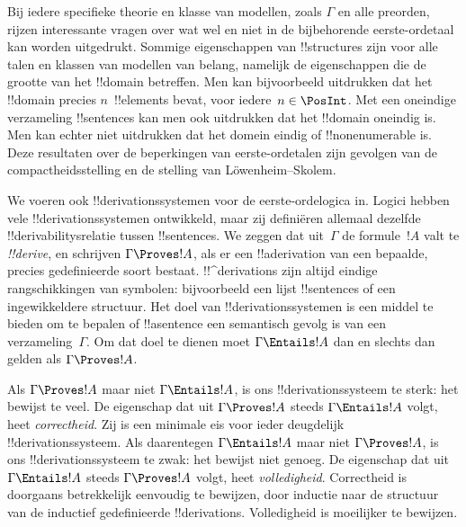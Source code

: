 \documentclass[openany]{memoir}
\begin{document}
Bij iedere specifieke theorie en klasse van modellen, zoals $\Gamma$
en alle preorden, rijzen interessante vragen over wat wel en niet in de
bijbehorende eerste-ordetaal kan worden uitgedrukt. Sommige
eigenschappen van !!{structure}s zijn voor alle talen en klassen van
modellen van belang, namelijk de eigenschappen die de grootte van het
!!{domain} betreffen. Men kan bijvoorbeeld uitdrukken dat het
!!{domain} precies $n$~!!{element}s bevat, voor iedere~$n \in \PosInt$.
Met een
oneindige verzameling !!{sentence}s kan men ook uitdrukken dat het
!!{domain} oneindig is. Men kan echter niet uitdrukken dat het domein
eindig of !!{nonenumerable} is. Deze resultaten over de beperkingen van
eerste-ordetalen zijn gevolgen van de compactheidsstelling en de
stelling van L\"owenheim--Skolem.
\endgroup

\begingroup
\def\olfilename{OLP-0148}
\def\olfilepath{content/first-order-logic/introduction/}
\hypertarget{unit-OLP-0148}{}





We voeren ook !!{derivation}ssystemen voor de eerste-ordelogica in.
Logici hebben vele !!{derivation}ssystemen ontwikkeld, maar zij
definiëren allemaal dezelfde !!{derivability}srelatie tussen
!!{sentence}s. We zeggen dat uit~$\Gamma$ de formule~$!A$ valt te
\emph{!!{derive}}, en schrijven $\Gamma \Proves !A$, als er een
!!a{derivation} van een bepaalde, precies gedefinieerde soort bestaat.
!!^{derivation}s zijn altijd eindige rangschikkingen van symbolen:
bijvoorbeeld een lijst !!{sentence}s of een ingewikkeldere structuur.
Het doel van !!{derivation}ssystemen is een middel te bieden om te
bepalen of !!a{sentence} een semantisch gevolg is van een
verzameling~$\Gamma$. Om dat doel te dienen moet $\Gamma \Entails !A$
dan en slechts dan gelden als $\Gamma \Proves !A$.

Als $\Gamma \Proves !A$ maar niet $\Gamma \Entails !A$, is ons
!!{derivation}ssysteem te sterk: het bewijst te veel. De eigenschap dat
uit $\Gamma \Proves !A$ steeds $\Gamma \Entails !A$ volgt, heet
\emph{correctheid}. Zij is een minimale eis voor ieder deugdelijk
!!{derivation}ssysteem. Als daarentegen $\Gamma \Entails !A$ maar niet
$\Gamma \Proves !A$, is ons !!{derivation}ssysteem te zwak: het bewijst
niet genoeg. De eigenschap dat uit $\Gamma \Entails !A$ steeds
$\Gamma \Proves !A$ volgt, heet \emph{volledigheid}. Correctheid is
doorgaans betrekkelijk eenvoudig te bewijzen, door inductie naar de
structuur van de inductief gedefinieerde !!{derivation}s. Volledigheid
is moeilijker te bewijzen.
\end{document}

